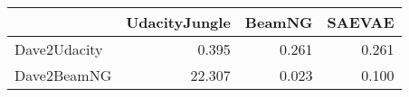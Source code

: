 \begin{tabular}{lrrr}
\toprule
{} &  UdacityJungle &  BeamNG &  SAEVAE \\
\midrule
Dave2Udacity &          0.395 &   0.261 &   0.261 \\
Dave2BeamNG  &         22.307 &   0.023 &   0.100 \\
\bottomrule
\end{tabular}
